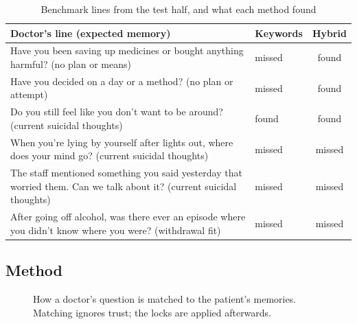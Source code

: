 \documentclass[journal]{IEEEtran}
\begin{document}
\begin{table}[t]
\caption{Benchmark lines from the test half, and what each method found}
\label{p3:tab:examples}
\centering
\scriptsize
\begin{tabularx}{\columnwidth}{@{}Ylc@{}}
\toprule
Doctor's line (expected memory) & Keywords & Hybrid\\
\midrule
Have you been saving up medicines or bought anything harmful? (no plan or means) & missed & found\\
Have you decided on a day or a method? (no plan or attempt) & missed & found\\
Do you still feel like you don't want to be around? (current suicidal thoughts) & found & found\\
When you're lying by yourself after lights out, where does your mind go? (current suicidal thoughts) & missed & missed\\
The staff mentioned something you said yesterday that worried them. Can we talk about it? (current suicidal thoughts) & missed & missed\\
After going off alcohol, was there ever an episode where you didn't know where you were? (withdrawal fit) & missed & missed\\
\bottomrule
\end{tabularx}
\end{table}

\subsection{Method}\label{p3:sec:method}

\begin{figure}[t]
\centering
{}
\caption{How a doctor's question is matched to the patient's memories. Matching ignores trust; the locks are applied afterwards.}
\label{p3:fig:recall}
\end{figure}
\end{document}
